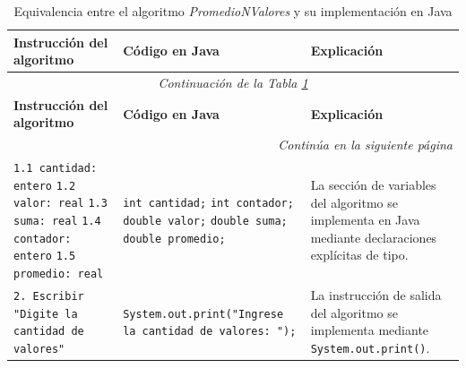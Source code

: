 \documentclass[12pt,twoside]{book}
\begin{document}
					\begin{landscape}
						
						\begin{longtable}{p{6cm} p{6cm} p{7.5cm}}
							
							\caption{Equivalencia entre el algoritmo \textit{PromedioNValores} y su implementación en Java}
							\label{tab:equivalenciaPromedio} \\
							
							\toprule
							\textbf{Instrucción del algoritmo} & \textbf{Código en Java} & \textbf{Explicación} \\
							\midrule
							\endfirsthead
							
							
							\multicolumn{3}{c}{\textit{Continuación de la Tabla \ref{tab:equivalenciaPromedio}}} \\
							\toprule
							\textbf{Instrucción del algoritmo} & \textbf{Código en Java} & \textbf{Explicación} \\
							\midrule
							\endhead
							
							
							\midrule
							\multicolumn{3}{r}{\textit{Continúa en la siguiente página}} \\
							\endfoot
							
							
							\bottomrule
							\endlastfoot
							
							
							
							\texttt{1.1 cantidad: entero} \newline
							\texttt{1.2 valor: real} \newline
							\texttt{1.3 suma: real} \newline
							\texttt{1.4 contador: entero} \newline
							\texttt{1.5 promedio: real}
							&
							\texttt{int cantidad;} \newline
							\texttt{int contador;} \newline
							\texttt{double valor;} \newline
							\texttt{double suma;} \newline
							\texttt{double promedio;}
							&
							La sección de variables del algoritmo se implementa en Java mediante declaraciones explícitas de tipo. \\
							
							
							\texttt{2. Escribir "Digite la cantidad de valores"}
							&
							\texttt{System.out.print("Ingrese la cantidad de valores: ");}
							&
							La instrucción de salida del algoritmo se implementa mediante \texttt{System.out.print()}. \\
							

\end{longtable}
\end{landscape}
\end{document}
